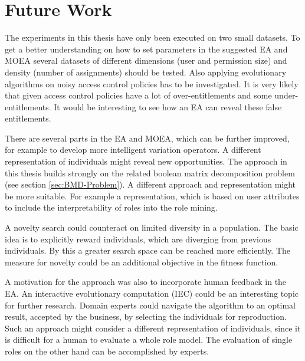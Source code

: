 \newpage
\chapter{Future Work}
\label{sec:futureWork}
The experiments in this thesis have only been executed on two small datasets. To get a better understanding on how to set parameters in the suggested EA and MOEA several datasets of different dimensions (user and permission size) and density (number of assignments) should be tested. Also applying evolutionary algorithms on noisy access control policies has to be investigated. It is very likely that given access control policies have a lot of over-entitlements and some under-entitlements. It would be interesting to see how an EA can reveal these false entitlements.

There are several parts in the EA and MOEA, which can be further improved, for example to develop more intelligent variation operators. A different representation of individuals might reveal new opportunities. The approach in this thesis builds strongly on the related boolean matrix decomposition problem (see section \ref{sec:BMD-Problem}). A different approach and representation might be more suitable. For example a representation, which is based on user attributes to include the interpretability of roles into the role mining.

A novelty search could counteract on limited diversity in a population. The basic idea is to explicitly reward individuals, which are diverging from previous individuals. By this a greater search space can be reached more efficiently. The measure for novelty could be an additional objective in the fitness function.

A motivation for the approach was also to incorporate human feedback in the EA. An interactive evolutionary computation (IEC)\cite{949485} could be an interesting topic for further research. Domain experts could navigate the algorithm to an optimal result, accepted by the business, by selecting the individuals for reproduction. Such an approach might consider a different representation of individuals, since it is difficult for a human to evaluate a whole role model. The evaluation of single roles on the other hand can be accomplished by experts.

